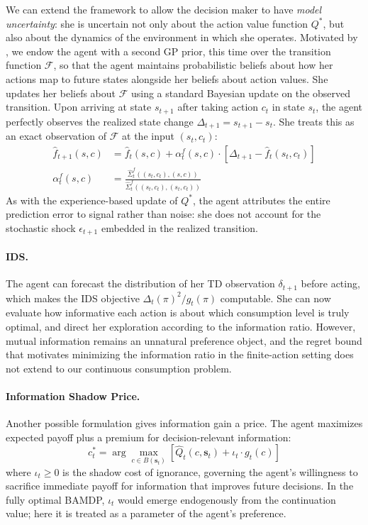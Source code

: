 We can extend the framework to allow the decision maker to have \textit{model uncertainty}:
she is uncertain not only about the action value function $Q^*$, but also about the
dynamics of the environment in which she operates. Motivated by \cite{DeisenrothRasmussen2011}, 
we endow the agent with a second GP prior, this time over the transition
function $\mathcal{F}$, so that the agent maintains probabilistic beliefs about how her actions map to future
states alongside her beliefs about action values.
She updates her beliefs about $\mathcal{F}$ using a
standard Bayesian update on the observed transition. Upon
arriving at state $s_{t+1}$ after taking action
$c_t$ in state $s_t$, the agent perfectly observes
the realized state change $\Delta_{t+1} = s_{t+1} -
s_t$. She treats this as an exact observation of
$\mathcal{F}$ at the input $(s_t, c_t)$:
\begin{align}
    \hat{f}_{t+1}(s, c)
    &= \hat{f}_t(s, c)
    + \alpha^f_t(s, c) \cdot
    \left[\Delta_{t+1}
    - \hat{f}_t(s_t, c_t)\right] \\
    \alpha^f_t(s, c)
    &= \frac{
        \hat{\Sigma}^f_t((s_t, c_t), (s, c))
    }{
        \hat{\Sigma}^f_t((s_t, c_t), (s_t, c_t))
    }
\end{align}
As with the experience-based update of $Q^*$, the agent
attributes the entire prediction error to signal rather than
noise: she does not account for the stochastic shock
$\epsilon_{t+1}$ embedded in the realized transition.

\paragraph{IDS.} The agent can forecast the distribution of
her TD observation $\delta_{t+1}$ before acting, which makes
the IDS objective $\Delta_t(\pi)^2 / g_t(\pi)$ computable.
She can now evaluate how informative each action is about
which consumption level is truly optimal, and direct her
exploration according to the information ratio. However,
mutual information remains an unnatural preference object,
and the regret bound that motivates minimizing the
information ratio in the finite-action setting does not
extend to our continuous consumption problem.

\paragraph{Information Shadow Price.} Another possible formulation
gives information gain a price. The agent maximizes expected
payoff plus a premium for decision-relevant information:
\begin{equation}
    c_t^* = \arg\max_{c \in B(\mathbf{s}_t)} \left[
        \hat{Q}_t(c, \mathbf{s}_t)
        + \iota_t \cdot g_t(c)
    \right]
\end{equation}
where $\iota_t \geq 0$ is the shadow cost of ignorance,
governing the agent's willingness to sacrifice immediate
payoff for information that improves future decisions. In the
fully optimal BAMDP, $\iota_t$ would emerge endogenously
from the continuation value; here it is treated as a
parameter of the agent's preference.

